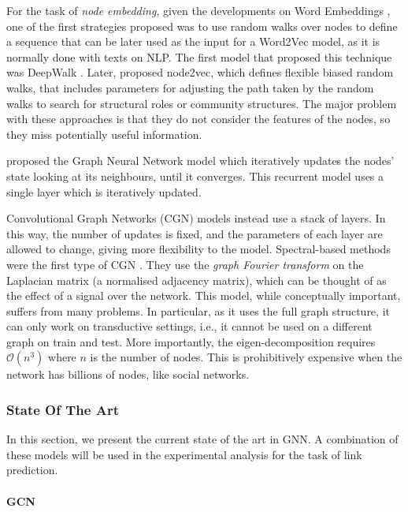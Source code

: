 \documentclass[smallextended]{svjour3}
\begin{document}
\begin{appendices}
		For the task of \textit{node embedding}, given the developments on Word Embeddings \cite{mikolov_linguistic_2013}, one of the first strategies proposed was to use random walks over nodes to define a sequence that can be later used as the input for a Word2Vec model, as it is normally done with texts on NLP. The first model that proposed this technique was DeepWalk \cite{perozzi_deepwalk_2014}. Later, \cite{grover_node2vec_2016} proposed node2vec, which defines flexible biased random walks, that includes parameters for adjusting the path taken by the random walks to search for structural roles or community structures. The major problem with these approaches is that they do not consider the features of the nodes, so they miss potentially useful information.
		
		\cite{scarselli_graph_2009} proposed the Graph Neural Network model which iteratively updates the nodes' state looking at its neighbours, until it converges. This recurrent model uses a single layer  which is iteratively updated. 
		
		Convolutional Graph Networks (CGN) models instead use a stack of layers. In this way, the number of updates is fixed, and the parameters of each layer are allowed to change, giving more flexibility to the model. 
		Spectral-based methods were the first type of CGN \cite{bruna_spectral_2014}. They use the \textit{graph Fourier transform} on the Laplacian matrix (a normalised adjacency matrix), which can be thought of as the effect of a signal over the network. This model, while conceptually important, suffers from many problems. In particular, as it uses the full graph structure, it can only work on transductive settings, i.e., it cannot be used on a different graph on train and test. More importantly, the eigen-decomposition requires $\mathcal{O}(n^3)$ where $n$ is the number of nodes. This is prohibitively expensive when the network has billions of nodes, like social networks.
		
		\subsubsection{State Of The Art}
		In this section, we present the current state of the art in GNN.  A combination of these models will be used in the experimental analysis for the task of link prediction. 
		
		\paragraph{GCN}
		

\end{appendices}
\end{document}
